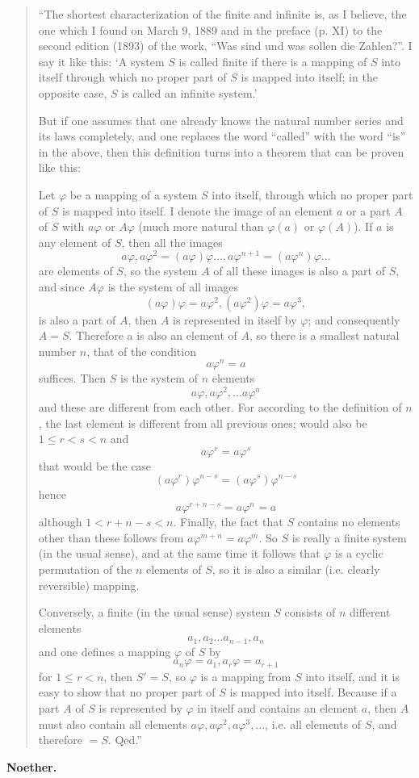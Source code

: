 \documentclass[leqno,hidelinks,a4paper]{article}
\theoremstyle{definition}
\begin{document}
\begin{quote}
``The shortest characterization of the finite and infinite is, as I believe, the one which I found on March 9, 1889 and in the preface (p. XI) to the second edition (1893) of the work, ``Was sind und was sollen die Zahlen?''.
I say it like this: `A system $S$ is called finite if there is a mapping of $S$ into itself through which no proper part of $S$ is mapped into itself; in the opposite case, $S$ is called an infinite system.'

But if one assumes that one already knows the natural number series and its laws completely, and one replaces the word ``called'' with the word ``is'' in the above, then this definition turns into a theorem that can be
proven like this:

Let $\varphi$ be a mapping of a system $S$ into itself, through which no proper part of $S$ is mapped into itself.
I denote the image of an element $a$ or a part $A$ of $S$ with $a\varphi$ or $A\varphi$ (much more natural than $\varphi(a)$ or $\varphi(A)$).
If $a$ is any element of $S$, then all the images
\[
	a\varphi, a\varphi^2= (a\varphi)\varphi \ldots, a\varphi^{n+1} = (a\varphi^n)\varphi \ldots
\]
are elements of $S$, so the system $A$ of all these images is also a part of $S$, and since $A\varphi$ is the system of all images
\[
	(a\varphi) \varphi = a\varphi^2, (a\varphi^2)\varphi = a\varphi^3,
\]
is also a part of $A$, then $A$ is represented in itself by $\varphi$; and consequently $A = S$.
Therefore a is also an element of $A$, so there is a smallest natural number $n$, that of the condition
\[
	a\varphi^n = a
\]
suffices. Then $S$ is the system of $n$ elements
\[
	a\varphi,a\varphi^2,\ldots a\varphi^n
\]
and these are different from each other.
For according to the definition of $n$, the last element is different from all previous ones; would also be $1 \leq r<s < n$ and
\[
	a\varphi^r = a\varphi^s
\]
that would be the case
\[
	(a\varphi^r)\varphi^{n-s} = (a\varphi^s) \varphi^{n-s}
\]
hence
\[
	a\varphi^{r+n-s} = a\varphi^n=a
\]
although $1<r+n-s<n$.
Finally, the fact that $S$ contains no elements other than these follows from $a\varphi^{m + n} = a\varphi^m$.
So $S$ is really a finite system (in the usual sense), and at the same time it follows that $\varphi$ is a cyclic permutation of the $n$ elements of $S$, so it is also a similar (i.e. clearly reversible) mapping.

Conversely, a finite (in the usual sense) system $S$ consists of $n$ different elements
\[
	a_1, a_2 \ldots a_{n-1}, a_n
\]
and one defines a mapping $\varphi$ of $S$ by
\[
a_n\varphi = a_1, a_r\varphi=a_{r+1}
\]
for $1\leq r<n$, then $S' = S$, so $\varphi$ is a mapping from $S$ into itself, and it is easy to show that no proper part of $S$ is mapped into itself.
Because if a part $A$ of $S$ is represented by $\varphi$ in itself and contains an element $a$, then $A$ must also contain all elements $a\varphi, a\varphi^2, a\varphi^3, \ldots$, i.e. all elements of $S$, and therefore $= S$. Qed.''
\end{quote}

\begin{flushright}
\textbf{Noether.}\end{flushright}
\end{document}
